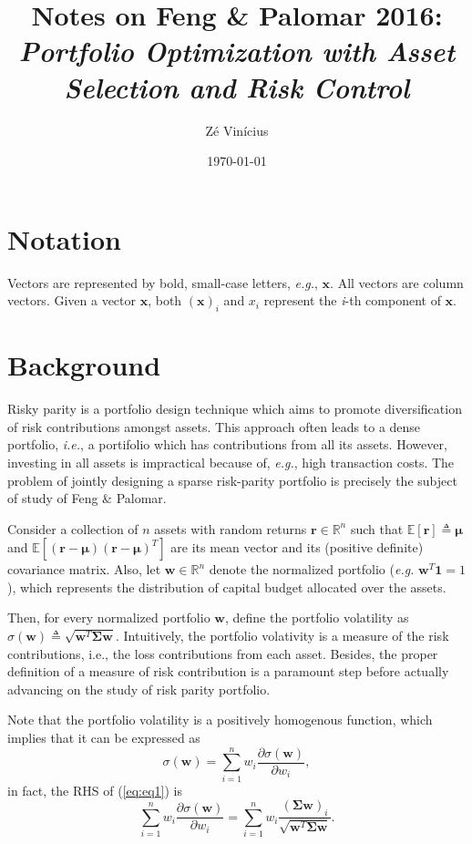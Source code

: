 \documentclass{article}
\title{Notes on Feng \& Palomar 2016: \textit{Portfolio Optimization with Asset Selection and Risk Control}}
\author{Z\'e Vin\'icius}
\date{\today}
\begin{document}
\maketitle

\section*{Notation}
Vectors are represented by bold, small-case letters, {\it e.g.}, $\bm{x}$.
All vectors are column vectors. Given a vector $\bm{x}$, both $(\bm{x})_{i}$ and
$x_i$ represent the {\it i}-th component of $\bm{x}$.

\section{Background}

Risky parity is a portfolio design technique which aims to promote
diversification of risk contributions amongst assets. This approach often
leads to a dense portfolio, {\it i.e.}, a portifolio which has contributions from all
its assets.
However, investing in all assets is impractical because of, {\it e.g.}, high transaction
costs.
The problem of jointly designing a sparse risk-parity portfolio is precisely the
subject of study of Feng \& Palomar.

Consider a collection of $n$ assets with random returns
$\bm{r} \in \mathbb{R}^{n}$ such that $\mathbb{E}[\bm{r}] \triangleq \bm{\mu}$ and
$\mathbb{E}\left[(\bm{r} - \bm{\mu})(\bm{r} - \bm{\mu})^{T}\right]$
are its mean vector and its (positive definite) covariance matrix. Also,
let $\bm{w} \in \mathbb{R}^{n}$ denote the normalized portfolio (\textit{e.g.} $\bm{w}^{T}\bm{1} = 1$), which represents the distribution of capital budget
allocated over the assets.

Then, for every normalized portfolio $\bm{w}$, define the portfolio volatility
as $\sigma(\bm{w}) \triangleq \sqrt{\bm{w}^{T}\bm{\Sigma}\bm{w}}$.
Intuitively, the portfolio volativity is a measure of the risk contributions,
i.e., the loss contributions from each asset. Besides, the proper definition
of a measure of risk contribution is a paramount step before actually advancing
on the study of risk parity portfolio.

Note that the portfolio volatility is a positively homogenous function, which
implies that it can be expressed as
\begin{equation}
\sigma(\bm{w}) = \sum_{i=1}^{n}w_{i}\dfrac{\partial \sigma(\bm{w})}{\partial w_i},
\label{eq:eq1}
\end{equation}
in fact, the RHS of (\ref{eq:eq1}) is
\begin{equation}
\sum_{i=1}^{n}w_{i}\dfrac{\partial \sigma(\bm{w})}{\partial w_i} = \sum_{i=1}^{n}
w_i \dfrac{(\bm{\Sigma}{\bm{w}})_{i}}{\sqrt{\bm{w}^{T}\bm{\Sigma}\bm{w}}}.
\label{eq:eq2}
\end{equation}
\end{document}
